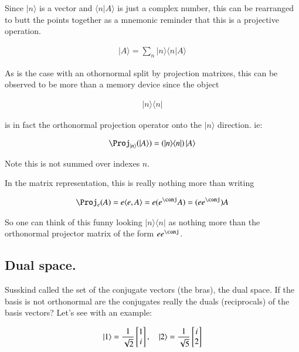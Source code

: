 \documentclass{article}
\newcommand{\ket}[1]{\lvert {#1} \rangle}
\newcommand{\bra}[1]{\langle {#1} \rvert}
\newcommand{\braket}[2]{\langle{#1} \vert {#2}\rangle}
\newcommand{\ketbra}[2]{\ket{#1}\bra{#2}}
\begin{document}
Since $\ket{n}$ is a vector and $\braket{n}{A}$ is just a complex number, this can be rearranged to butt the points
together as a mnemonic reminder that this is a projective operation.

\begin{align*}
\ket{A} = \sum_n \ket{n} \braket{n}{A} 
\end{align*}

As is the case with an othornormal split by projection matrixes, this can be observed to be more than a memory
device since the object

\begin{align*}
\ketbra{n}{n}
\end{align*}

is in fact the orthonormal projection operator onto the $\ket{n}$ direction.  ie:

\begin{align*}
\Proj_{\ket{n}}(\ket{A}) = \left( \ketbra{n}{n} \right) \ket{A}
\end{align*}

Note this is not summed over indexes $n$.

In the matrix representation, this is really nothing more than writing

\begin{align*}
\Proj_{e} (A) = e \innerprod{e}{A} = e (e^\conj A) = (e e^\conj) A
\end{align*}

So one can think of this funny looking $\ketbra{n}{n}$ as nothing more than the orthonormal projector matrix of the form $e e^\conj$.

\subsection{ Dual space. }

Susskind called the set of the conjugate vectors (the bras), the dual space.  If the basis is not orthonormal
are the conjugates really the duals (reciprocals) of the basis vectors?  Let's see with an example:

\begin{align*}
\ket{1} = 
\inv{\sqrt{2}}
\begin{bmatrix}
1 \\
i
\end{bmatrix}
, \quad
\ket{2} = 
\inv{\sqrt{5}}
\begin{bmatrix}
i \\
2
\end{bmatrix}
\end{align*}
\end{document}
